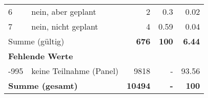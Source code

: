 \begin{longtable}{lXrrr}
     6 &
     \multicolumn{1}{X}{ nein, aber geplant   } &


       \num{2} &
       \num[round-mode=places,round-precision=2]{0,3} &
         \num[round-mode=places,round-precision=2]{0,02} \\

     7 &
     \multicolumn{1}{X}{ nein, nicht geplant   } &


       \num{4} &
       \num[round-mode=places,round-precision=2]{0,59} &
         \num[round-mode=places,round-precision=2]{0,04} \\
     \midrule
     \multicolumn{2}{l}{Summe (gültig)} &
       \textbf{\num{676}} &
     \textbf{100} &
       \textbf{\num[round-mode=places,round-precision=2]{6,44}} \\
     \multicolumn{5}{l}{\textbf{Fehlende Werte}}\\
       -995 &
       keine Teilnahme (Panel) &
         \num{9818} &
        - &
         \num[round-mode=places,round-precision=2]{93,56} \\
     \midrule
     \multicolumn{2}{l}{\textbf{Summe (gesamt)}} &
          \textbf{\num{10494}} &
        \textbf{-} &
        \textbf{100} \\
     \bottomrule
     \end{longtable}
     

